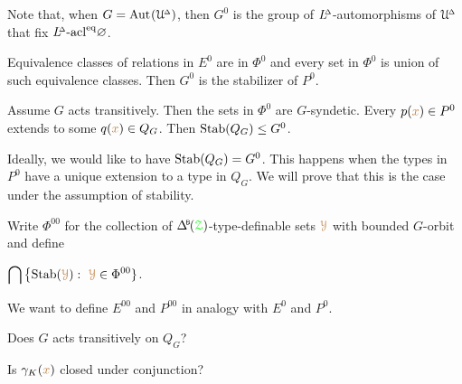 Note that, when $G={\rm Aut\kern.15ex}(\EuScript U\kern-.2ex^{\scriptscriptstyle\Delta})$, then $G^0$ is the group of $L\kern-.5ex^{\scriptscriptstyle\Delta}$-automorphisms of $\EuScript U\kern-.2ex^{\scriptscriptstyle\Delta}$ that fix $L\kern-.5ex^{\scriptscriptstyle\Delta}\mbox-{\rm acl}^{{\rm eq}}\varnothing$.%

\begin{remark}\label{lem_trans_action}
  Equivalence classes of relations in $E^0$ are in $\Phi^0$ and every set in $\Phi^0$ is union of such equivalence classes.
  Then $G^0$ is the stabilizer of $P^0$.\smallskip

  Assume $G$ acts transitively.
  Then the sets in $\Phi^0$ are $G$-syndetic.
  Every $p({\color{brown} x})\in P^0$ extends to some $q({\color{brown} x})\in Q_G$.
  Then ${\rm Stab}(Q_G)\le G^0$.
\end{remark}


Ideally, we would like to have ${\rm Stab}(Q_G)=G^0$.
This happens when the types in $P^0$ have a unique extension to a type in $Q_G$.
We will prove that this is the case under the assumption of stability.


\begin{definition}\label{def_G00}
  Write \emph{$\Phi^{00}$\/} for the collection of $\BDelta(\grZ)$-type-definable sets ${\color{brown}\EuScript Y}$ with bounded $G$-orbit and define\smallskip

  \medrel{=}$\displaystyle\bigcap\big\{{\rm Stab}({\color{brown}\EuScript Y}) :\  {\color{brown}\EuScript Y}\in\Phi^{00}\}$.
\end{definition}

We want to define $E^{00}$ and $P^{00}$ in analogy with $E^0$ and $P^0$.

\begin{question}
  Does $G$ acts transitively on $Q_G$?
\end{question}

\begin{question}
  Is $\gamma_K({\color{brown} x})$ closed under conjunction?
\end{question}






